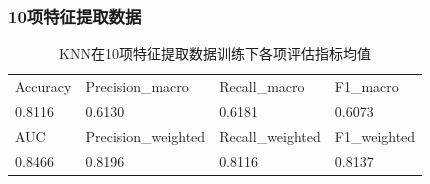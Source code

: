 \documentclass[10pt]{article}
\begin{document}
\subsubsection*{10项特征提取数据}
\begin{table}[H]
  \centering
  \caption{KNN在10项特征提取数据训练下各项评估指标均值}
  \begin{tabular}{llll}
  \toprule
  Accuracy & Precision\_macro & Recall\_macro & F1\_macro \\
  0.8116 & 0.6130 & 0.6181 & 0.6073 \\
  \midrule
  AUC & Precision\_weighted & Recall\_weighted & F1\_weighted \\
  0.8466 & 0.8196 & 0.8116 & 0.8137 \\
  \bottomrule
  \end{tabular}
\end{table}
\end{document}
